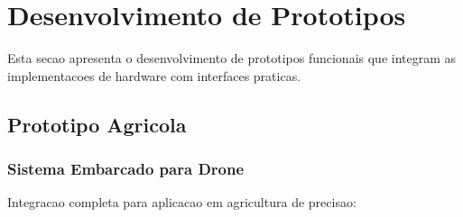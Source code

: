 \section{Desenvolvimento de Prototipos}\label{sec:prototipos}

Esta secao apresenta o desenvolvimento de prototipos funcionais que integram as implementacoes de hardware com interfaces praticas.

\subsection{Prototipo Agricola}

\subsubsection{Sistema Embarcado para Drone}
Integracao completa para aplicacao em agricultura de precisao:

